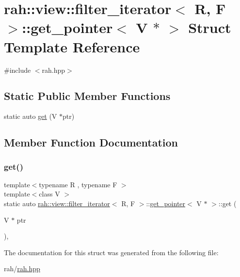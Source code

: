 \hypertarget{structrah_1_1view_1_1filter__iterator_1_1get__pointer_3_01_v_01_5_01_4}{}\section{rah\+::view\+::filter\+\_\+iterator$<$ R, F $>$\+::get\+\_\+pointer$<$ V $\ast$ $>$ Struct Template Reference}
\label{structrah_1_1view_1_1filter__iterator_1_1get__pointer_3_01_v_01_5_01_4}


{\ttfamily \#include $<$rah.\+hpp$>$}

\subsection*{Static Public Member Functions}
\begin{DoxyCompactItemize}
\item 
static auto \mbox{\hyperlink{structrah_1_1view_1_1filter__iterator_1_1get__pointer_3_01_v_01_5_01_4_acd2fa44341836177456b526e9ba6fb14}{get}} (V $\ast$ptr)
\end{DoxyCompactItemize}


\subsection{Member Function Documentation}
\mbox{\label{structrah_1_1view_1_1filter__iterator_1_1get__pointer_3_01_v_01_5_01_4_acd2fa44341836177456b526e9ba6fb14}} 
\subsubsection{\texorpdfstring{get()}{get()}}
{\footnotesize\ttfamily template$<$typename R , typename F $>$ \\
template$<$class V $>$ \\
static auto \mbox{\hyperlink{structrah_1_1view_1_1filter__iterator}{rah\+::view\+::filter\+\_\+iterator}}$<$ R, F $>$\+::\mbox{\hyperlink{structrah_1_1view_1_1filter__iterator_1_1get__pointer}{get\+\_\+pointer}}$<$ V $\ast$ $>$\+::get (\begin{DoxyParamCaption}\item[{V $\ast$}]{ptr }\end{DoxyParamCaption})\hspace{0.3cm}{\ttfamily [inline]}, {\ttfamily [static]}}



The documentation for this struct was generated from the following file\+:\begin{DoxyCompactItemize}
\item 
rah/\mbox{\hyperlink{rah_8hpp}{rah.\+hpp}}\end{DoxyCompactItemize}
